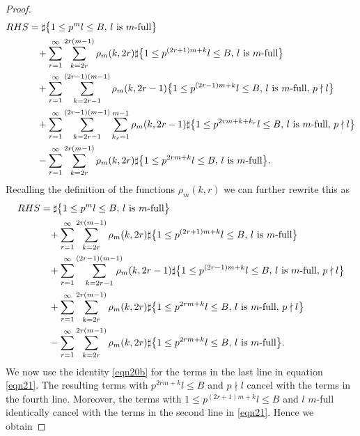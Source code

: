 \documentclass[JEP,XML,SOM,Unicode,published]{cedram}
\theoremstyle{definition}
\numberwithin{theorem}{section}
\begin{document}
\begin{proof}
\begin{equation*}
\begin{split}
RHS &=\sharp\bigl\{1\leq p^ml\leq B,\, l \mbox{ is $m$-full}\bigr\} \\
&\hspace*{3mm}+\sum_{r=1}^{\infty} \sum_{k=2r}^{2r(m-1)}\rho_m(k,2r)\sharp\bigl\{1\leq p^{(2r+1)m+k}l\leq B,\, l \mbox{ is $m$-full}\bigr\}\\
&\hspace*{3mm}+ \sum_{r=1}^\infty\sum_{k=2r-1}^{(2r-1)(m-1)}\rho_m(k,2r-1)\bigl\{1\leq p^{(2r-1)m+k}l\leq B,\, l \mbox{ is $m$-full},\, p\nmid l\bigr\}\\
&\hspace*{3mm}+ \sum_{r=1}^\infty\sum_{k=2r-1}^{(2r-1)(m-1)}\sum_{k_r=1}^{m-1}\rho_m(k,2r-1)\sharp\bigl\{1\leq p^{2rm+k+k_r}l\leq B,\, l \mbox{ is $m$-full},\, p\nmid l\bigr\}\\
&\hspace*{3mm}-\sum_{r=1}^\infty\sum_{k=2r}^{2r(m-1)}\rho_m(k,2r)\sharp\bigl\{1\leq p^{2rm+k}l\leq B,\, l \mbox{ is $m$-full}\bigr\}.
\end{split}
\end{equation*}
Recalling the definition of the functions $\rho_m(k,r)$ we can further rewrite this as
\begin{align}\label{eqn21}
RHS &=\sharp\bigl\{1\leq p^ml\leq B,\, l \mbox{ is $m$-full}\bigr\}\notag \\
&\hspace*{3mm}+\sum_{r=1}^{\infty} \sum_{k=2r}^{2r(m-1)}\rho_m(k,2r)\sharp\bigl\{1\leq p^{(2r+1)m+k}l\leq B,\, l \mbox{ is $m$-full}\bigr\}\notag\\
&\hspace*{3mm}+ \sum_{r=1}^\infty\sum_{k=2r-1}^{(2r-1)(m-1)}\hspace*{-3mm}\rho_m(k,2r-1)\sharp\bigl\{1\leq p^{(2r-1)m+k}l\leq B,\, l \mbox{ is $m$-full},\, p\nmid l\bigr\}\\
&\hspace*{3mm}+ \sum_{r=1}^\infty\sum_{k=2r}^{2r(m-1)}\rho_m(k,2r)\sharp\bigl\{1\leq p^{2rm+k}l\leq B,\, l \mbox{ is $m$-full},\, p\nmid l\bigr\}\notag\\
&\hspace*{3mm}-\sum_{r=1}^\infty\sum_{k=2r}^{2r(m-1)}\rho_m(k,2r)\sharp\bigl\{1\leq p^{2rm+k}l\leq B,\, l \mbox{ is $m$-full}\bigr\}.\notag
\end{align}
We now use the identity \eqref{eqn20b} for the terms in the last line in equation \eqref{eqn21}. The resulting terms with $p^{2rm+k}l\leq B$ and $p\nmid l$ cancel with the terms in the fourth line. Moreover, the terms with $1\leq p^{(2r+1)m+k}l\leq B$ and $l$ $m$-full identically cancel with the terms in the second line in \eqref{eqn21}. Hence we obtain

\end{proof}
\end{document}
